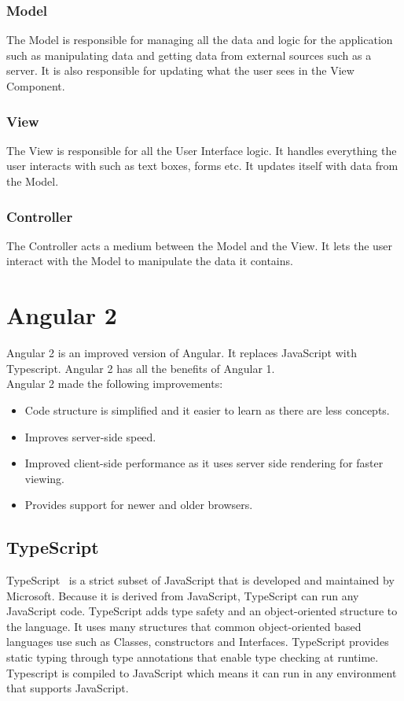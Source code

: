 \subsubsection{Model}
The Model is responsible for managing all the data and logic for the application such as manipulating data and getting data from external sources such as a server. It is also responsible for updating what the user sees in the View Component. 

\subsubsection{View}
The View is responsible for all the User Interface logic. It handles everything the user interacts with such as text boxes, forms etc. It updates itself with data from the Model.

\subsubsection{Controller}
The Controller acts a medium between the Model and the View. It lets the user interact with the Model to manipulate the data it contains.




\section{Angular 2}
Angular 2 is an improved version of Angular. It replaces JavaScript with Typescript. Angular 2 has all the benefits of Angular 1. \\

Angular 2 made the following improvements:
\begin{itemize}
\item Code structure is simplified and it easier to learn as there are less concepts.
\item Improves server-side speed.
\item Improved client-side performance as it uses server side rendering for faster viewing.
\item Provides support for newer and older browsers.
\end{itemize}

\subsection{TypeScript}
TypeScript~\cite{TypeScript} is a strict subset of JavaScript that is developed and maintained by Microsoft. Because it is derived from JavaScript, TypeScript can run any JavaScript code. 
TypeScript adds type safety and an object-oriented structure to the language. It uses many structures that common object-oriented based languages use such as Classes, constructors and Interfaces. 
TypeScript provides static typing through type annotations that enable type checking at runtime. Typescript is compiled to JavaScript which means it can run in any environment that supports JavaScript. \\

